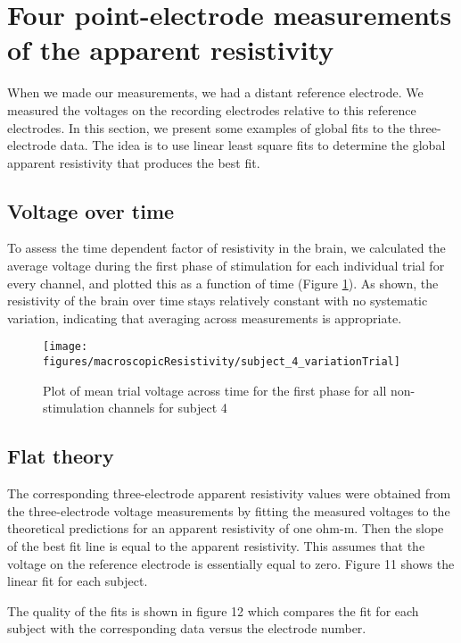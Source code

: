 \section{Four point-electrode measurements of the apparent resistivity}

When we made our measurements, we had a distant reference electrode. We measured the voltages on the recording electrodes relative to this reference electrodes.
In this section, we present some examples of global fits to the three-electrode data. The idea is to use linear least square fits to determine the global apparent resistivity that produces the best fit.

\subsection{Voltage over time}
To assess the time dependent factor of resistivity in the brain, we calculated the average voltage during the first phase of stimulation for each individual trial for every channel, and plotted this as a function of time (Figure \ref{fig:mrVoltageOverTime}). As shown, the resistivity of the brain over time stays relatively constant with no systematic variation, indicating that averaging across measurements is appropriate. 

\begin{figure}[ht]
	\centering
	\texttt{[image: figures/macroscopicResistivity/subject\_4\_variationTrial]}
	\caption[Recorded voltage over time]{Plot of mean trial voltage across time for the first phase for all non-stimulation channels for subject 4}
	\label{fig:mrVoltageOverTime}
\end{figure}

\subsection{Flat theory}

The corresponding three-electrode apparent resistivity values were obtained from the three-electrode voltage measurements by fitting the measured voltages to the theoretical predictions for an apparent resistivity of one ohm-m. Then the slope of the best fit line is equal to the apparent resistivity. This assumes that the voltage on the reference electrode is essentially equal to zero. Figure 11 shows the linear fit for each subject.

The quality of the fits is shown in figure 12 which compares the fit for each subject with the corresponding data versus the electrode number.


